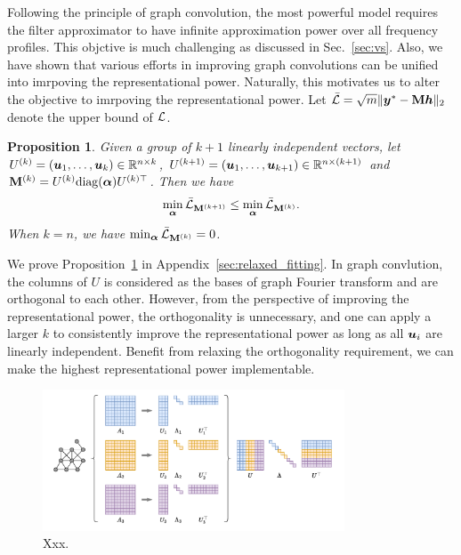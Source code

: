\documentclass{article} %
\def\valpha{{\bm\alpha}}
\newtheorem{proposition}{\textbf{Proposition}} %
\begin{document}
	Following the principle of graph convolution, the most powerful model requires the filter approximator to have infinite approximation power over all frequency profiles.
	This objctive is much challenging as discussed in Sec.~\ref{sec:vs}.
	Also, we have shown that various efforts in improving graph convolutions can be unified into imrpoving the representational power.
	Naturally, this motivates us to alter the objective to imrpoving the representational power.
	Let $\bar{{\mathcal{L}}}=\sqrt{m}\|{\bm{y}}^*-{\mathbf{M}}{\bm{h}}\|_2$ denote the upper bound of ${\mathcal{L}}$.
	\begin{proposition}
		\label{prop:relaxed_fitting}
		Given a group of $k+1$ linearly independent vectors, let $U^{(k)}=({\bm{u}}_1,\dots,{\bm{u}}_k)\in{\mathbb{R}}^{n\times k}$, $U^{(k+1)}=({\bm{u}}_1,\dots,{\bm{u}}_{k+1})\in{\mathbb{R}}^{n\times(k+1)}$ and $\rmM^{(k)}=U^{(k)}\mathrm{diag}(\valpha)U^{(k)\top}$.
		Then we have
		\begin{equation}
			\begin{aligned}
				\min_{\valpha}\bar\gL_{\rmM^{(k+1)}}\leq\min_{\valpha}\bar\gL_{\rmM^{(k)}}.
			\end{aligned}
		\end{equation}
		When $k=n$, we have $\min_{\valpha}\bar\gL_{\rmM^{(k)}}=0$.
	\end{proposition}
	We prove Proposition~\ref{prop:relaxed_fitting} in Appendix~\ref{sec:relaxed_fitting}.
	In graph convlution, the columns of $U$ is considered as the bases of graph Fourier transform and are orthogonal to each other.
	However, from the perspective of improving the representational power, the orthogonality is unnecessary, and one can apply a larger $k$ to consistently improve the representational power as long as all ${\bm{u}}_i$ are linearly independent.
	Benefit from relaxing the orthogonality requirement, we can make the highest representational power implementable.
	
	\begin{figure}[h]
		\centering
		\includegraphics[width=0.8\textwidth]{figure/mte}
		\caption{Xxx.}
		\label{fig:mte}
	\end{figure}
	
\end{document}
